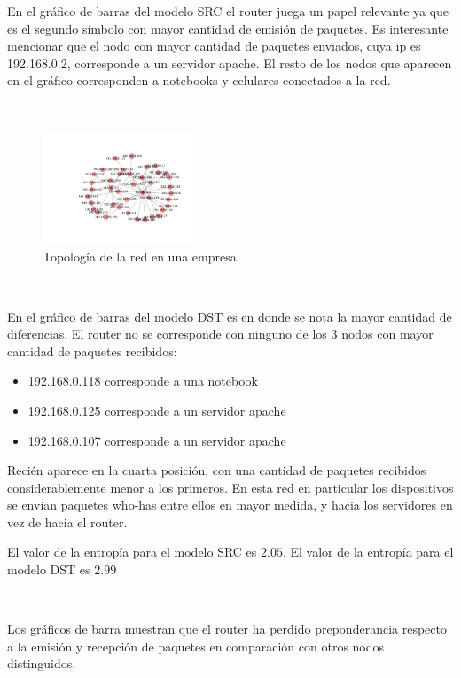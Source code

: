 En el gráfico de barras del modelo SRC el router juega un papel relevante ya que es el segundo
símbolo con mayor cantidad de emisión de paquetes. Es interesante mencionar que el 
nodo con mayor cantidad de paquetes enviados, cuya ip es 192.168.0.2, corresponde a un servidor apache.
El resto de los nodos que aparecen en el gráfico corresponden a notebooks
y celulares conectados a la red.

~

\begin{figure}
\vspace{-35pt}
\hspace{-35pt}
\centering
   \includegraphics[width=0.4\textwidth]{resultados/empresa/conectividadNX.pdf}
\vspace{-30pt}
   \caption{Topología de la red en una empresa}
\end{figure}

~

En el gráfico de barras del modelo DST es en donde se nota la mayor cantidad de diferencias. 
El router no se corresponde con ninguno de los 3 nodos con mayor cantidad de paquetes
recibidos:

\begin{itemize}
    \item 192.168.0.118 corresponde a una notebook
    \item 192.168.0.125 corresponde a un servidor apache
    \item 192.168.0.107 corresponde a un servidor apache
\end{itemize}

Recién aparece en la cuarta posición, con una cantidad de paquetes recibidos considerablemente
menor a los primeros. En esta red en particular los dispositivos se envían paquetes
who-has entre ellos en mayor medida, y hacia los servidores en vez de hacia el router.

El valor de la entropía para el modelo SRC es $2.05$. El valor de la entropía para 
el modelo DST es $2.99$


~

Los gráficos de barra muestran que el router ha perdido preponderancia respecto a la emisión
y recepción de paquetes en comparación con otros nodos distinguidos.

